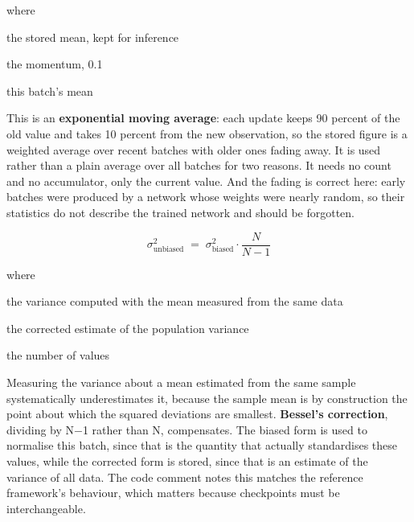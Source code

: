 \noindent where
\begin{description}[leftmargin=2.4em,style=nextline,font=\normalfont\ttfamily]\setlength\itemsep{1pt}
  \item[{$\hat{\mu}$}] \normalfont the stored mean, kept for inference
  \item[{$m$}] \normalfont the momentum, 0.1
  \item[{$\mu_c$}] \normalfont this batch's mean
\end{description}
This is an \textbf{exponential moving average}: each update keeps 90 percent of the old value and takes 10 percent from the new observation, so the stored figure is a weighted average over recent batches with older ones fading away. It is used rather than a plain average over all batches for two reasons. It needs no count and no accumulator, only the current value. And the fading is correct here: early batches were produced by a network whose weights were nearly random, so their statistics do not describe the trained network and should be forgotten.



\begin{equation}
\sigma^2_{\mathrm{unbiased}} \;=\; \sigma^2_{\mathrm{biased}} \cdot \frac{N}{N-1}
\end{equation}

\noindent where
\begin{description}[leftmargin=2.4em,style=nextline,font=\normalfont\ttfamily]\setlength\itemsep{1pt}
  \item[{$\sigma^2_{\mathrm{biased}}$}] \normalfont the variance computed with the mean measured from the same data
  \item[{$\sigma^2_{\mathrm{unbiased}}$}] \normalfont the corrected estimate of the population variance
  \item[{$N$}] \normalfont the number of values
\end{description}
Measuring the variance about a mean estimated from the same sample systematically underestimates it, because the sample mean is by construction the point about which the squared deviations are smallest. \textbf{Bessel's correction}, dividing by N$-$1 rather than N, compensates. The biased form is used to normalise this batch, since that is the quantity that actually standardises these values, while the corrected form is stored, since that is an estimate of the variance of all data. The code comment notes this matches the reference framework's behaviour, which matters because checkpoints must be interchangeable.


